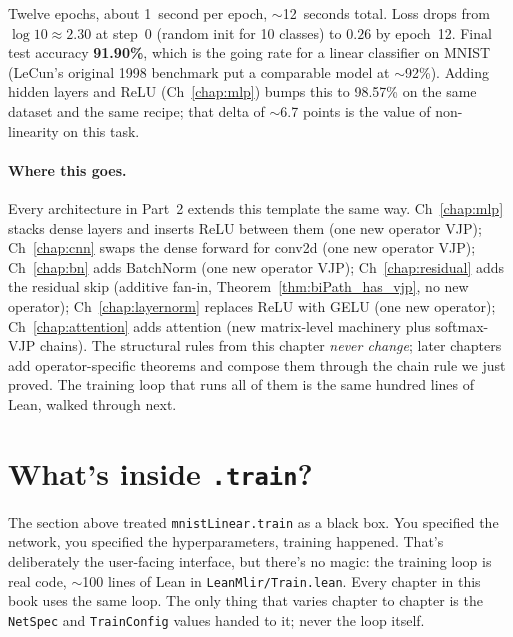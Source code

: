 Twelve epochs, about 1~second per epoch, $\sim$12~seconds total.
Loss drops from \(\log 10 \approx 2.30\) at step~0 (random
init for 10 classes) to $0.26$ by epoch~12. Final test accuracy
\textbf{91.90\%}, which is the going rate for a linear classifier
on MNIST (LeCun's original 1998 benchmark put a comparable model
at \(\sim\)92\%). Adding hidden layers and ReLU
(Ch~\ref{chap:mlp}) bumps this to 98.57\% on the same dataset and
the same recipe; that delta of $\sim$6.7 points is the value of
non-linearity on this task.

\paragraph{Where this goes.}
Every architecture in Part~2 extends this template the same way.
Ch~\ref{chap:mlp} stacks dense layers and inserts ReLU between
them (one new operator VJP); Ch~\ref{chap:cnn} swaps the dense
forward for conv2d (one new operator VJP); Ch~\ref{chap:bn} adds
BatchNorm (one new operator VJP); Ch~\ref{chap:residual} adds the
residual skip (additive fan-in, Theorem~\ref{thm:biPath_has_vjp},
no new operator); Ch~\ref{chap:layernorm} replaces ReLU with GELU
(one new operator); Ch~\ref{chap:attention} adds attention (new
matrix-level machinery plus softmax-VJP chains). The structural
rules from this chapter \emph{never change}; later chapters add
operator-specific theorems and compose them through the chain rule
we just proved. The training loop that runs all of them is the
same hundred lines of Lean, walked through next.

\section*{What's inside \texttt{.train}?}
\label{sec:mlp_inside_train}

The section above treated \texttt{mnistLinear.train} as a black box.
You specified the network, you specified the hyperparameters,
training happened. That's deliberately the user-facing interface,
but there's no magic: the training loop is real code, $\sim$100 lines
of Lean in \texttt{LeanMlir/Train.lean}. Every chapter in this book
uses the same loop. The only thing that varies chapter to chapter is
the \texttt{NetSpec} and \texttt{TrainConfig} values handed to it;
never the loop itself.

